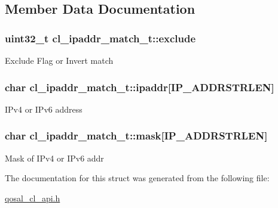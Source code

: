\subsection{Member Data Documentation}
\hypertarget{structcl__ipaddr__match__t_a6a25abdb21cb01ef165f545730b69547}{
\subsubsection[{exclude}]{\setlength{\rightskip}{0pt plus 5cm}uint32\-\_\-t cl\-\_\-ipaddr\-\_\-match\-\_\-t\-::exclude}}\label{structcl__ipaddr__match__t_a6a25abdb21cb01ef165f545730b69547}
Exclude Flag or Invert match \hypertarget{structcl__ipaddr__match__t_a3579a408f626c12e0e7187b68a599d8e}{
\subsubsection[{ipaddr}]{\setlength{\rightskip}{0pt plus 5cm}char cl\-\_\-ipaddr\-\_\-match\-\_\-t\-::ipaddr\mbox{[}{\bf I\-P\-\_\-\-A\-D\-D\-R\-S\-T\-R\-L\-E\-N}\mbox{]}}}\label{structcl__ipaddr__match__t_a3579a408f626c12e0e7187b68a599d8e}
I\-Pv4 or I\-Pv6 address \hypertarget{structcl__ipaddr__match__t_af1c611cf5751752aac9df3b4451436f0}{
\subsubsection[{mask}]{\setlength{\rightskip}{0pt plus 5cm}char cl\-\_\-ipaddr\-\_\-match\-\_\-t\-::mask\mbox{[}{\bf I\-P\-\_\-\-A\-D\-D\-R\-S\-T\-R\-L\-E\-N}\mbox{]}}}\label{structcl__ipaddr__match__t_af1c611cf5751752aac9df3b4451436f0}
Mask of I\-Pv4 or I\-Pv6 addr 

The documentation for this struct was generated from the following file\-:\begin{DoxyCompactItemize}
\item 
\hyperlink{qosal__cl__api_8h}{qosal\-\_\-cl\-\_\-api.\-h}\end{DoxyCompactItemize}
